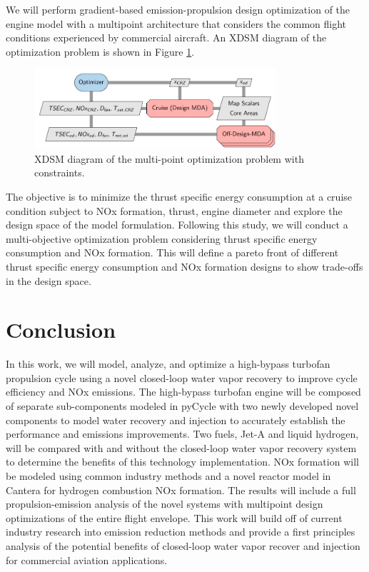 \documentclass[conf]{new-aiaa}
\begin{document}
We will perform gradient-based emission-propulsion design optimization of the engine model with a multipoint architecture that considers the common flight conditions experienced by commercial aircraft.
An XDSM diagram of the optimization problem is shown in Figure \ref{fig:opt_prob}.

\begin{figure}[H]
	\centering
	\includegraphics[width=0.8\textwidth]{N3_inject.pdf}
	\caption{XDSM diagram of the multi-point optimization problem with constraints.}
	\label{fig:opt_prob}
\end{figure}

The objective is to minimize the thrust specific energy consumption at a cruise condition subject to NOx formation, thrust, engine diameter and explore the design space of the model formulation.
Following this study, we will conduct a multi-objective optimization problem considering thrust specific energy consumption and NOx formation.
This will define a pareto front of different thrust specific energy consumption and NOx formation designs to show trade-offs in the design space.

\section{Conclusion}
In this work, we will model, analyze, and optimize a high-bypass turbofan propulsion cycle using a novel closed-loop water vapor recovery to improve cycle efficiency and NOx emissions.
The high-bypass turbofan engine will be composed of separate sub-components modeled in pyCycle with two newly developed novel components to model water recovery and injection to accurately establish the performance and emissions improvements.
Two fuels, Jet-A and liquid hydrogen, will be compared with and without the closed-loop water vapor recovery system to determine the benefits of this technology implementation.
NOx formation will be modeled using common industry methods and a novel reactor model in Cantera for hydrogen combustion NOx formation.
The results will include a full propulsion-emission analysis of the novel systems with multipoint design optimizations of the entire flight envelope.
This work will build off of current industry research into emission reduction methods and provide a first principles analysis of the potential benefits of closed-loop water vapor recover and injection for commercial aviation applications.


\end{document}
